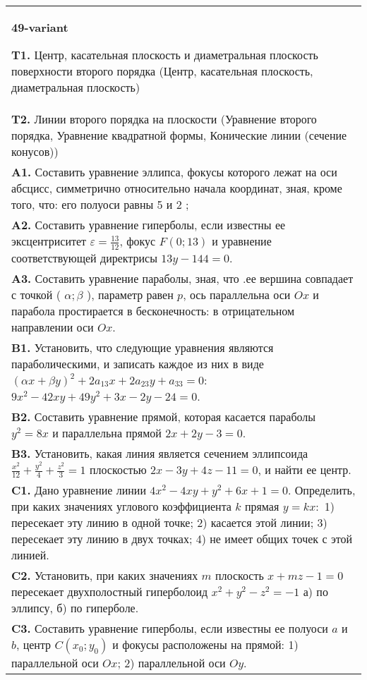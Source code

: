 \documentclass{article}
\begin{document}
\begin{tabular}{m{17cm}}
\textbf{49-variant}
\newline

\textbf{T1.} Центр, касательная плоскость и диаметральная плоскость поверхности второго порядка (Центр, касательная плоскость, диаметральная плоскость) \\
\textbf{T2.} Линии второго порядка на плоскости (Уравнение второго порядка, Уравнение квадратной формы, Конические линии (сечение конусов)) \\
\textbf{A1.} Составить уравнение эллипса, фокусы которого лежат на оси абсцисс, симметрично относительно начала координат, зная, кроме того, что: его полуоси равны 5 и 2 ; \\
\textbf{A2.} Составить уравнение гиперболы, если известны ее эксцентриситет $\varepsilon=\frac{13}{12}$, фокус $F(0 ; 13)$ и уравнение соответствующей директрисы $13 y-144=0$. \\
\textbf{A3.} Составить уравнение параболы, зная, что .ее вершина совпадает с точкой ( $\alpha ; \beta$ ), параметр равен $p$, ось параллельна оси $O x$ и парабола простирается в бесконечность: в отрицательном направлении оси $O x$. \\
\textbf{B1.} Установить, что следующие уравнения являются параболическими, и записать каждое из них в виде $(\alpha x+\beta y)^2+2 a_{13} x+2 a_{23} y+a_{33}=0$: $9 x^2-42 x y+49 y^2+3 x-2 y-24=0$. \\
\textbf{B2.} Составить уравнение прямой, которая касается параболы $y^2=8 x$ и параллельна прямой $2 x+2 y-3=0$. \\
\textbf{B3.} Установить, какая линия является сечением эллипсоида $\frac{x^2}{12}+\frac{y^2}{4}+\frac{z^2}{3}=1$ плоскостью $2 x-3 y+4 z-11=0$, и найти ее центр. \\
\textbf{C1.} Дано уравнение линии $4 x^2-4 x y+y^2+6 x+1=0$. Определить, при каких значениях углового коэффициента $k$ прямая $y=k x:$ 1) пересекает эту линию в одной точке; 2) касается этой линии; 3) пересекает эту линию в двух точках; 4) не имеет общих точек с этой линией. \\
\textbf{C2.} Установить, при каких значениях $m$ плоскость $x+m z-1=0$ пересекает двухполостный гиперболоид $x^2+y^2-z^2=-1$ а) по эллипсу, б) по гиперболе. \\
\textbf{C3.} Составить уравнение гиперболы, если известны ее полуоси $a$ и $b$, центр $C\left(x_0 ; y_0\right)$ и фокусы расположены на прямой: 1) параллельной оси $O x$; 2) параллельной оси $O y$. \\

\end{tabular}
\vspace{1cm}
\end{document}
